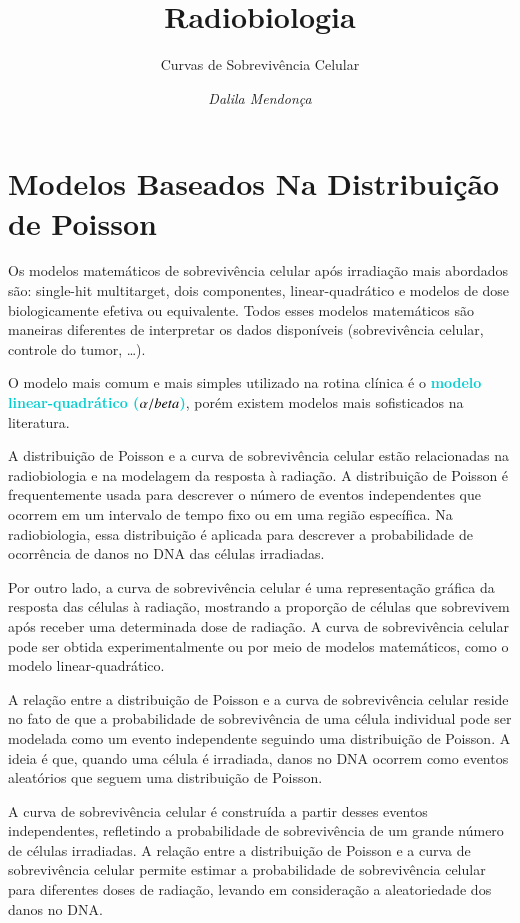 \documentclass[11pt,a4paper]{article}
\title{\LobsterTwo\Huge{Radiobiologia}}
\author{\LobsterTwo\Large{Curvas de Sobrevivência Celular}\nocite{*}}
\date{\LobsterTwo\textit{Dalila Mendonça}}
\begin{document}
	\maketitle

\section{Modelos Baseados Na Distribuição de Poisson}

	Os modelos matemáticos de sobrevivência celular após irradiação mais abordados são: single-hit multitarget, dois componentes, linear-quadrático e modelos de dose biologicamente efetiva ou equivalente. Todos esses modelos matemáticos são maneiras diferentes de interpretar os dados disponíveis (sobrevivência celular, controle do tumor, \dots).

  	O modelo mais comum e mais simples utilizado na rotina clínica é o \textcolor{DarkTurquoise}{\Large\LobsterTwo\textbf{modelo linear-quadrático ($\mathbf\mathrm{\alpha/beta}$)}}, porém existem modelos mais sofisticados na literatura. 

	A distribuição de Poisson e a curva de sobrevivência celular estão relacionadas na radiobiologia e na modelagem da resposta à radiação. A distribuição de Poisson é frequentemente usada para descrever o número de eventos independentes que ocorrem em um intervalo de tempo fixo ou em uma região específica. Na radiobiologia, essa distribuição é aplicada para descrever a probabilidade de ocorrência de danos no DNA das células irradiadas.

	Por outro lado, a curva de sobrevivência celular é uma representação gráfica da resposta das células à radiação, mostrando a proporção de células que sobrevivem após receber uma determinada dose de radiação. A curva de sobrevivência celular pode ser obtida experimentalmente ou por meio de modelos matemáticos, como o modelo linear-quadrático. 

	A relação entre a distribuição de Poisson e a curva de sobrevivência celular reside no fato de que a probabilidade de sobrevivência de uma célula individual pode ser modelada como um evento independente seguindo uma distribuição de Poisson. A ideia é que, quando uma célula é irradiada, danos no DNA ocorrem como eventos aleatórios que seguem uma distribuição de Poisson.

	A curva de sobrevivência celular é construída a partir desses eventos independentes, refletindo a probabilidade de sobrevivência de um grande número de células irradiadas. A relação entre a distribuição de Poisson e a curva de sobrevivência celular permite estimar a probabilidade de sobrevivência celular para diferentes doses de radiação, levando em consideração a aleatoriedade dos danos no DNA.
\end{document}
